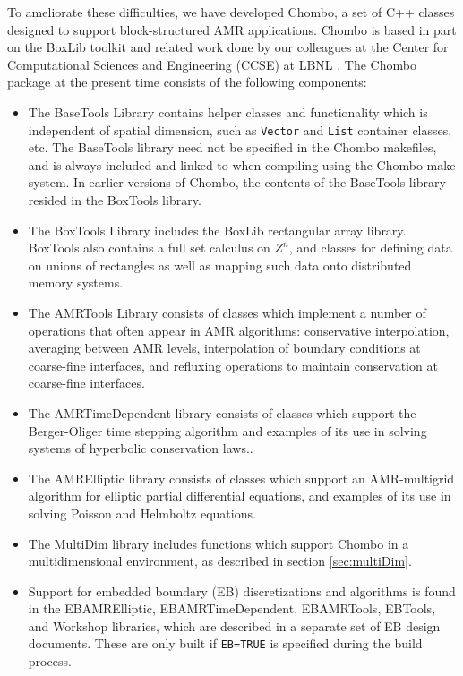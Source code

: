 To ameliorate these difficulties, we have developed Chombo, a set of
C++ classes designed to support block-structured AMR applications.  
Chombo is based in part on the BoxLib toolkit and related work done by
our colleagues at the Center for Computational Sciences and Engineering
(CCSE) at LBNL \cite{crutchfieldwelcome:1993} \cite{CCSE1999}.
The Chombo package at the present time consists of the following
components: 
\begin{itemize}
\item The BaseTools Library contains helper classes and functionality
which is independent of spatial dimension, such as {\tt Vector} and
{\tt List} container classes, etc. The BaseTools library need not be
specified in the Chombo makefiles, and is always included and linked
to when compiling using the Chombo make system. In earlier versions of
Chombo, the contents of the BaseTools library resided in the BoxTools
library.   

\item The BoxTools Library includes the BoxLib rectangular array
library.  BoxTools also contains a full set calculus on $Z^n$, and
classes for  defining data on unions of rectangles as well as mapping
such data onto distributed memory systems. 

\item The AMRTools Library consists of classes which implement a number of
operations that often appear in AMR algorithms: conservative
interpolation, averaging between AMR levels, interpolation of boundary
conditions at coarse-fine interfaces, and refluxing operations to
maintain conservation at coarse-fine interfaces.

\item The AMRTimeDependent library consists of classes which support
the Berger-Oliger time stepping algorithm and examples of its use in
solving  systems of hyperbolic conservation laws..

\item The AMRElliptic library consists of classes which support
        an AMR-multigrid algorithm for elliptic partial differential
        equations, and examples of its use in solving Poisson and
        Helmholtz equations.    

\item The MultiDim library includes functions which support Chombo in
  a multidimensional environment, as described in section
  \ref{sec:multiDim}.  

\item Support for embedded boundary (EB) discretizations and
  algorithms is found in the EBAMRElliptic, EBAMRTimeDependent,
  EBAMRTools, EBTools, and Workshop libraries, which are described in
  a separate set of EB design documents. These are only built if {\tt EB=TRUE} 
  is specified during the build process.

\end{itemize}


